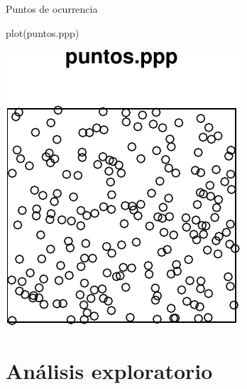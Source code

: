 \documentclass[
  11pt,
  ignorenonframetext,
]{beamer}
\newenvironment{Shaded}{}{}
\newcommand{\FunctionTok}[1]{\textcolor[rgb]{0.02,0.16,0.49}{#1}}
\newcommand{\NormalTok}[1]{#1}
\begin{document}
\begin{frame}[fragile]{Puntos de ocurrencia}
\protect\hypertarget{puntos-de-ocurrencia-1}{}
\begin{Shaded}
\begin{Highlighting}[]
\FunctionTok{plot}\NormalTok{(puntos.ppp)}
\end{Highlighting}
\end{Shaded}

\begin{center}\includegraphics{Tutorial-spatstat_files/figure-beamer/unnamed-chunk-14-1} \end{center}
\end{frame}

\hypertarget{anuxe1lisis-exploratorio}{%
\section{Análisis exploratorio}\label{anuxe1lisis-exploratorio}}
\end{document}
